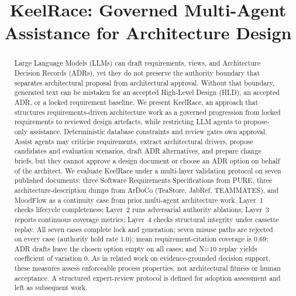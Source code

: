 \documentclass[conference]{IEEEtran}
\begin{document}
\title{KeelRace: Governed Multi-Agent Assistance for Architecture Design}

\author{
}

\maketitle

\begin{abstract}
Large Language Models (LLMs) can draft requirements, views, and Architecture Decision Records (ADRs), yet they do not preserve the authority boundary that separates architectural proposal from architectural approval.
Without that boundary, generated text can be mistaken for an accepted High-Level Design (HLD), an accepted ADR, or a locked requirement baseline.
We present KeelRace, an approach that structures requirements-driven architecture work as a governed progression from locked requirements to reviewed design artefacts, while restricting LLM agents to propose-only assistance.
Deterministic database constraints and review gates own approval.
Assist agents may criticise requirements, extract architectural drivers, propose candidates and evaluation scenarios, draft ADR alternatives, and prepare change briefs, but they cannot approve a design document or choose an ADR option on behalf of the architect.
We evaluate KeelRace under a multi-layer validation protocol on seven published documents: three Software Requirements Specifications from PURE, three architecture-description dumps from ArDoCo (TeaStore, JabRef, TEAMMATES), and MoodFlow as a continuity case from prior multi-agent architecture work.
Layer~1 checks lifecycle completeness; Layer~2 runs adversarial authority ablations; Layer~3 reports continuous coverage metrics; Layer~4 checks structural integrity under cassette replay.
All seven cases complete lock and generation; seven misuse paths are rejected on every case (authority hold rate $1.0$); mean requirement-citation coverage is $0.69$; ADR drafts leave the chosen option empty on all cases; and N=10 replay yields coefficient of variation $0$.
As in related work on evidence-grounded decision support, these measures assess enforceable process properties, not architectural fitness or human acceptance.
A structured expert-review protocol is defined for adoption assessment and left as subsequent work.
\end{abstract}
\end{document}
